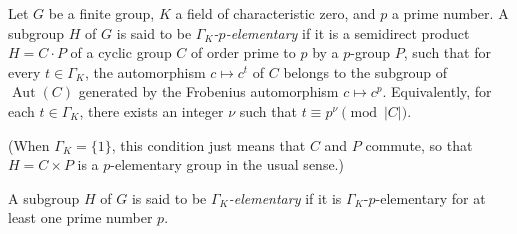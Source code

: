 Let $G$ be a finite group, $K$ a field of characteristic zero, and $p$ a prime number. A subgroup $H$ of $G$ is said to be \emph{$\Gamma_K$-$p$-elementary} if it is a semidirect product $H = C \cdot P$ of a cyclic group $C$ of order prime to $p$ by a $p$-group $P$, such that for every $t \in \Gamma_K$, the automorphism $c \mapsto c^t$ of $C$ belongs to the subgroup of $\operatorname{Aut}(C)$ generated by the Frobenius automorphism $c \mapsto c^p$. Equivalently, for each $t \in \Gamma_K$, there exists an integer $\nu$ such that $t \equiv p^{\nu} \pmod{|C|}$.

(When $\Gamma_K = \{1\}$, this condition just means that $C$ and $P$ commute, so that $H = C \times P$ is a $p$-elementary group in the usual sense.)

A subgroup $H$ of $G$ is said to be \emph{$\Gamma_K$-elementary} if it is $\Gamma_K$-$p$-elementary for at least one prime number $p$.

